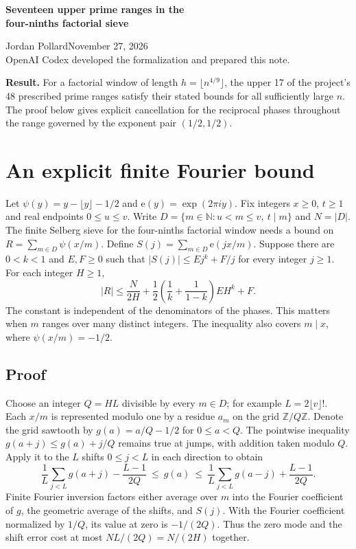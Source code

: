 \documentclass[10pt]{article}
\newcommand{\ee}{\mathrm{e}}
\begin{document}
{\LARGE\bfseries Seventeen upper prime ranges in the\\[2pt] four-ninths factorial sieve}\par\medskip
Jordan Pollard\hfill November 27, 2026\\
{\small OpenAI Codex developed the formalization and prepared this note.}

\textbf{Result.} For a factorial window of length $h=\lfloor n^{4/9}\rfloor$, the upper 17 of the project's 48 prescribed prime ranges satisfy their stated bounds for all sufficiently large $n$. The proof below gives explicit cancellation for the reciprocal phases throughout the range governed by the exponent pair $(1/2,1/2)$.
\section*{An explicit finite Fourier bound}
Let $\psi(y)=y-\lfloor y\rfloor-1/2$ and $\ee(y)=\exp(2\pi i y)$. Fix integers $x\ge0$, $t\ge1$ and real endpoints $0\le u\le v$. Write $D=\{m\in\mathbb N:u<m\le v,\ t\mid m\}$ and $N=|D|$. The finite Selberg sieve for the four-ninths factorial window needs a bound on $R=\sum_{m\in D}\psi(x/m)$. Define $S(j)=\sum_{m\in D}\ee(jx/m)$. Suppose there are $0<k<1$ and $E,F\ge0$ such that $|S(j)|\le E j^k+F/j$ for every integer $j\ge1$. For each integer $H\ge1$,
\begin{equation}
 |R|\le \frac N{2H}
       +\frac12\left(\frac1k+\frac1{1-k}\right)E H^k+F .
 \tag{1}
\end{equation}
The constant is independent of the denominators of the phases. This matters when $m$ ranges over many distinct integers. The inequality also covers $m\mid x$, where $\psi(x/m)=-1/2$.

\subsection*{Proof}
Choose an integer $Q=HL$ divisible by every $m\in D$; for example $L=2\lfloor v\rfloor!$. Each $x/m$ is represented modulo one by a residue $a_m$ on the grid $\mathbb Z/Q\mathbb Z$. Denote the grid sawtooth by $g(a)=a/Q-1/2$ for $0\le a<Q$. The pointwise inequality $g(a+j)\le g(a)+j/Q$ remains true at jumps, with addition taken modulo $Q$. Apply it to the $L$ shifts $0\le j<L$ in each direction to obtain
\[
 \frac1L\sum_{j<L}g(a+j)-\frac{L-1}{2Q}
 \ \le\ g(a)\ \le\
 \frac1L\sum_{j<L}g(a-j)+\frac{L-1}{2Q}.
\]
Finite Fourier inversion factors either average over $m$ into the Fourier coefficient of $g$, the geometric average of the shifts, and $S(j)$. With the Fourier coefficient normalized by $1/Q$, its value at zero is $-1/(2Q)$. Thus the zero mode and the shift error cost at most $NL/(2Q)=N/(2H)$ together.
\end{document}
